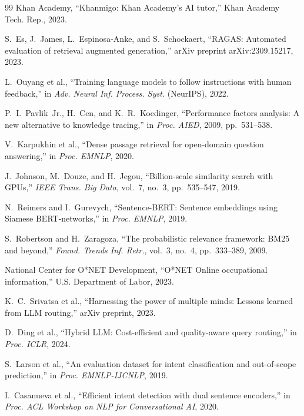 \documentclass[conference]{IEEEtran}
\begin{document}
\begin{thebibliography}{99}
 Khan Academy, ``Khanmigo: Khan Academy's AI
tutor,'' Khan Academy Tech. Rep., 2023.

 S.~Es, J.~James, L.~Espinosa-Anke, and
S.~Schockaert, ``RAGAS: Automated evaluation of retrieval augmented
generation,'' arXiv preprint arXiv:2309.15217, 2023.

 L.~Ouyang et al., ``Training
language models to follow instructions with human feedback,'' in
\emph{Adv. Neural Inf. Process. Syst.} (NeurIPS), 2022.

 P.~I.~Pavlik~Jr., H.~Cen, and
K.~R.~Koedinger, ``Performance factors analysis: A new alternative
to knowledge tracing,'' in \emph{Proc. AIED}, 2009, pp.~531--538.

 V.~Karpukhin et al., ``Dense passage
retrieval for open-domain question answering,'' in \emph{Proc.
EMNLP}, 2020.

 J.~Johnson, M.~Douze, and H.~Jegou,
``Billion-scale similarity search with GPUs,'' \emph{IEEE Trans.
Big Data}, vol.~7, no.~3, pp.~535--547, 2019.

 N.~Reimers and I.~Gurevych,
``Sentence-BERT: Sentence embeddings using Siamese BERT-networks,''
in \emph{Proc. EMNLP}, 2019.

 S.~Robertson and H.~Zaragoza, ``The
probabilistic relevance framework: BM25 and beyond,'' \emph{Found.
Trends Inf. Retr.}, vol.~3, no.~4, pp.~333--389, 2009.

 National Center for O*NET Development, ``O*NET
Online occupational information,'' U.S. Department of Labor, 2023.

 K.~C.~Srivatsa et al., ``Harnessing
the power of multiple minds: Lessons learned from LLM routing,''
arXiv preprint, 2023.

 D.~Ding et al., ``Hybrid LLM:
Cost-efficient and quality-aware query routing,'' in \emph{Proc.
ICLR}, 2024.

 S.~Larson et al., ``An evaluation
dataset for intent classification and out-of-scope prediction,''
in \emph{Proc. EMNLP-IJCNLP}, 2019.

 I.~Casanueva et al., ``Efficient
intent detection with dual sentence encoders,'' in \emph{Proc. ACL
Workshop on NLP for Conversational AI}, 2020.


\end{thebibliography}
\end{document}
